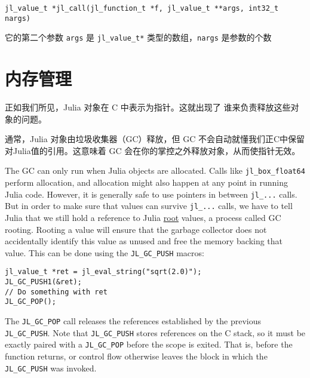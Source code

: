 \begin{lstlisting}
jl_value_t *jl_call(jl_function_t *f, jl_value_t **args, int32_t nargs)
\end{lstlisting}



它的第二个参数 \texttt{args} 是 \texttt{jl\_value\_t*} 类型的数组，\texttt{nargs} 是参数的个数 



\hypertarget{3779983102705119396}{}


\section{内存管理}



正如我们所见，Julia 对象在 C 中表示为指针。这就出现了 谁来负责释放这些对象的问题。



通常，Julia 对象由垃圾收集器（GC）释放，但 GC 不会自动就懂我们正C中保留对Julia值的引用。这意味着 GC 会在你的掌控之外释放对象，从而使指针无效。



The GC can only run when Julia objects are allocated. Calls like \texttt{jl\_box\_float64} perform allocation, and allocation might also happen at any point in running Julia code. However, it is generally safe to use pointers in between \texttt{jl\_...} calls. But in order to make sure that values can survive \texttt{jl\_...} calls, we have to tell Julia that we still hold a reference to Julia \href{https://www.cs.purdue.edu/homes/hosking/690M/p611-fenichel.pdf}{root} values, a process called {\textquotedbl}GC rooting{\textquotedbl}. Rooting a value will ensure that the garbage collector does not accidentally identify this value as unused and free the memory backing that value. This can be done using the \texttt{JL\_GC\_PUSH} macros:




\begin{lstlisting}
jl_value_t *ret = jl_eval_string("sqrt(2.0)");
JL_GC_PUSH1(&ret);
// Do something with ret
JL_GC_POP();
\end{lstlisting}



The \texttt{JL\_GC\_POP} call releases the references established by the previous \texttt{JL\_GC\_PUSH}. Note that \texttt{JL\_GC\_PUSH} stores references on the C stack, so it must be exactly paired with a \texttt{JL\_GC\_POP} before the scope is exited. That is, before the function returns, or control flow otherwise leaves the block in which the \texttt{JL\_GC\_PUSH} was invoked.



